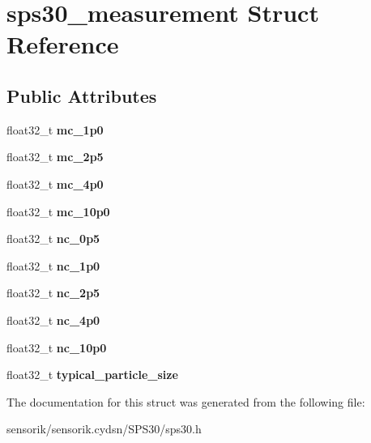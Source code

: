 \hypertarget{structsps30__measurement}{}\section{sps30\+\_\+measurement Struct Reference}
\label{structsps30__measurement}
\subsection*{Public Attributes}
\begin{DoxyCompactItemize}
\item 
\mbox{\label{structsps30__measurement_a5fff5baf4b0830c9e9bb997059e65a99}} 
float32\+\_\+t {\bfseries mc\+\_\+1p0}
\item 
\mbox{\label{structsps30__measurement_afd8deaf496f346afb3f0641390110c4e}} 
float32\+\_\+t {\bfseries mc\+\_\+2p5}
\item 
\mbox{\label{structsps30__measurement_afc9ab194ca71643cbe1cce788c0a9775}} 
float32\+\_\+t {\bfseries mc\+\_\+4p0}
\item 
\mbox{\label{structsps30__measurement_aa3535946abf9ca99136f3586cfdfb2db}} 
float32\+\_\+t {\bfseries mc\+\_\+10p0}
\item 
\mbox{\label{structsps30__measurement_afbb9cb8ef197102810b5da58e477f06a}} 
float32\+\_\+t {\bfseries nc\+\_\+0p5}
\item 
\mbox{\label{structsps30__measurement_a7012153febe4d4c16f6cb744b2c66da7}} 
float32\+\_\+t {\bfseries nc\+\_\+1p0}
\item 
\mbox{\label{structsps30__measurement_a243ce51d93f1da3e01df7c114e6710b6}} 
float32\+\_\+t {\bfseries nc\+\_\+2p5}
\item 
\mbox{\label{structsps30__measurement_a7fdda9ea88f76d2550286224eaa11691}} 
float32\+\_\+t {\bfseries nc\+\_\+4p0}
\item 
\mbox{\label{structsps30__measurement_a31ad8c777ef6dcc983a40ec5ea34d2c7}} 
float32\+\_\+t {\bfseries nc\+\_\+10p0}
\item 
\mbox{\label{structsps30__measurement_a288ff9077ff979e4efd4ca38edfaa2ef}} 
float32\+\_\+t {\bfseries typical\+\_\+particle\+\_\+size}
\end{DoxyCompactItemize}


The documentation for this struct was generated from the following file\+:\begin{DoxyCompactItemize}
\item 
sensorik/sensorik.\+cydsn/\+S\+P\+S30/sps30.\+h\end{DoxyCompactItemize}
